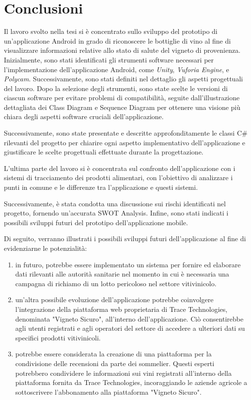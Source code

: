 \chapter{Conclusioni}

Il lavoro svolto nella tesi si è concentrato sullo sviluppo del prototipo di un'applicazione Android in grado di riconoscere le bottiglie di vino al fine di visualizzare informazioni relative allo stato di salute del vigneto di provenienza. Inizialmente, sono stati identificati gli strumenti software necessari per l'implementazione dell'applicazione Android, come \textit{Unity}, \textit{Vuforia Engine}, e \textit{Polycam}. Successivamente, sono stati definiti nel dettaglio gli aspetti progettuali del lavoro. Dopo la selezione degli strumenti, sono state scelte le versioni di ciascun software per evitare problemi di compatibilità, seguite dall'illustrazione dettagliata dei Class Diagram e Sequence Diagram per ottenere una visione più chiara degli aspetti software cruciali dell'applicazione.

Successivamente, sono state presentate e descritte approfonditamente le classi C\# rilevanti del progetto per chiarire ogni aspetto implementativo dell'applicazione e giustificare le scelte progettuali effettuate durante la progettazione.

L'ultima parte del lavoro si è concentrata sul confronto dell'applicazione con i sistemi di tracciamento dei prodotti alimentari, con l'obiettivo di analizzare i punti in comune e le differenze tra l'applicazione e questi sistemi.

Successivamente, è stata condotta una discussione sui rischi identificati nel progetto, fornendo un'accurata SWOT Analysis. Infine, sono stati indicati i possibili sviluppi futuri del prototipo dell'applicazione mobile.

Di seguito, verranno illustrati i possibili sviluppi futuri dell'applicazione al fine di evidenziarne le potenzialità:

\begin{enumerate}
	\item in futuro, potrebbe essere implementato un sistema per fornire ed elaborare dati rilevanti alle autorità sanitarie nel momento in cui è necessaria una campagna di richiamo di un lotto pericoloso nel settore vitivinicolo.
	\item un'altra possibile evoluzione dell'applicazione potrebbe coinvolgere l'integrazione della piattaforma web proprietaria di Trace Technologies, denominata "Vigneto Sicuro", all'interno dell'applicazione. Ciò consentirebbe agli utenti registrati e agli operatori del settore di accedere a ulteriori dati su specifici prodotti vitivinicoli.
	\item potrebbe essere considerata la creazione di una piattaforma per la condivisione delle recensioni da parte dei sommelier. Questi esperti potrebbero condividere le informazioni sui vini registrati all'interno della piattaforma fornita da Trace Technologies, incoraggiando le aziende agricole a sottoscrivere l'abbonamento alla piattaforma "Vigneto Sicuro".
\end{enumerate}
